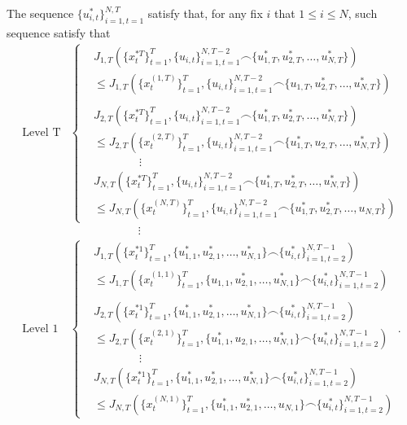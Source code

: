 \documentclass[letterpaper, 10 pt, conference]{ieeeconf}  %
\begin{document}
The sequence $\{ u_{i,t}^{*}\}_{i=1,t=1}^{N,T}$ satisfy that, for any fix $i$ that $1 \leq i \leq N$, such 
sequence satisfy that 
\begin{equation}\label{eq:nashIneq}
    \begin{split}
        \text{Level T}
        &\begin{cases}
            &J_{1,T}(\{x_{t}^{*T}\}_{t=1}^{T}, \{u_{i,t}\}_{i=1,t=1}^{N,T-2} \frown \{u_{1,T}^{*},u_{2,T}^{*},\dots,u_{N,T}^{*}\}) \\ & \leq J_{1,T}(\{x_{t}^{(1,T)}\}_{t=1}^{T}, \{u_{i,t}\}_{i=1,t=1}^{N,T-2} \frown \{u_{1,T},u_{2,T}^{*},\dots,u_{N,T}^{*}\})\\ \\
            &J_{2,T}(\{x_{t}^{*T}\}_{t=1}^{T}, \{u_{i,t}\}_{i=1,t=1}^{N,T-2} \frown \{u_{1,T}^{*},u_{2,T}^{*},\dots,u_{N,T}^{*}\}) \\ & \leq J_{2,T}(\{x_{t}^{(2,T)}\}_{t=1}^{T}, \{u_{i,t}\}_{i=1,t=1}^{N,T-2} \frown \{u_{1,T}^{*},u_{2,T},\dots,u_{N,T}^{*}\})\\
            & \qquad \qquad \vdots \\
            &J_{N,T}(\{x_{t}^{*T}\}_{t=1}^{T}, \{u_{i,t}\}_{i=1,t=1}^{N,T-2} \frown \{u_{1,T}^{*},u_{2,T}^{*},\dots,u_{N,T}^{*}\}) \\ & \leq J_{N,T}(\{x_{t}^{(N,T)}\}_{t=1}^{T}, \{u_{i,t}\}_{i=1,t=1}^{N,T-2} \frown \{u_{1,T}^{*},u_{2,T}^{*},\dots,u_{N,T}\})
        \end{cases}
    \\ &\qquad \qquad \qquad \vdots \\
    \text{Level 1}
        &\begin{cases}
            &J_{1,T}(\{x_{t}^{*1}\}_{t=1}^{T}, \{u_{1,1}^{*},u_{2,1}^{*},\dots,u_{N,1}^{*}\} \frown \{u_{i,t}^{*}\}_{i=1,t=2}^{N,T-1}) \\ & \leq J_{1,T}(\{x_{t}^{(1,1)}\}_{t=1}^{T}, \{u_{1,1},u_{2,1}^{*},\dots,u_{N,1}^{*}\} \frown \{u_{i,t}^{*}\}_{i=1,t=2}^{N,T-1})\\ \\
            &J_{2,T}(\{x_{t}^{*1}\}_{t=1}^{T}, \{u_{1,1}^{*},u_{2,1}^{*},\dots,u_{N,1}^{*}\} \frown \{u_{i,t}^{*}\}_{i=1,t=2}^{N,T-1}) \\ & \leq J_{2,T}(\{x_{t}^{(2,1)}\}_{t=1}^{T}, \{u_{1,1}^{*},u_{2,1},\dots,u_{N,1}^{*}\} \frown \{u_{i,t}^{*}\}_{i=1,t=2}^{N,T-1})\\
            & \qquad \qquad \vdots \\
            &J_{N,T}(\{x_{t}^{*1}\}_{t=1}^{T}, \{u_{1,1}^{*},u_{2,1}^{*},\dots,u_{N,1}^{*}\} \frown \{u_{i,t}^{*}\}_{i=1,t=2}^{N,T-1}) \\ & \leq J_{N,T}(\{x_{t}^{(N,1)}\}_{t=1}^{T}, \{u_{1,1}^{*},u_{2,1}^{*},\dots,u_{N,1}\} \frown \{u_{i,t}^{*}\}_{i=1,t=2}^{N,T-1})
        \end{cases}.
    \end{split}
\end{equation}
\end{document}
